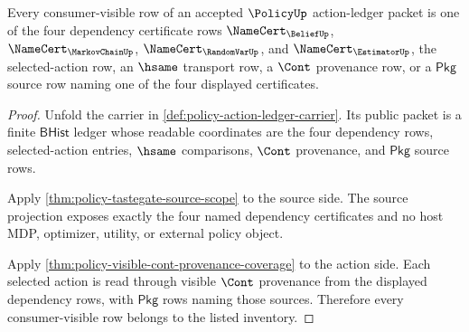 \begin{theorem}
\label{thm:policy-dependency-source-exactness}
Every consumer-visible row of an accepted $\PolicyUp$ action-ledger packet is
one of the four dependency certificate rows
$\NameCert_{\BeliefUp}$, $\NameCert_{\MarkovChainUp}$,
$\NameCert_{\RandomVarUp}$, and $\NameCert_{\EstimatorUp}$, the selected-action
row, an $\hsame$ transport row, a $\Cont$ provenance row, or a $\mathsf{Pkg}$
source row naming one of the four displayed certificates.
\end{theorem}
\begin{proof}
Unfold the carrier in \autoref{def:policy-action-ledger-carrier}. Its public
packet is a finite $\mathsf{BHist}$ ledger whose readable coordinates are the
four dependency rows, selected-action entries, $\hsame$ comparisons, $\Cont$
provenance, and $\mathsf{Pkg}$ source rows.

Apply \autoref{thm:policy-tastegate-source-scope} to the source side. The
source projection exposes exactly the four named dependency certificates and no
host MDP, optimizer, utility, or external policy object.

Apply \autoref{thm:policy-visible-cont-provenance-coverage} to the action side.
Each selected action is read through visible $\Cont$ provenance from the
displayed dependency rows, with $\mathsf{Pkg}$ rows naming those sources.
Therefore every consumer-visible row belongs to the listed inventory.
\end{proof}


